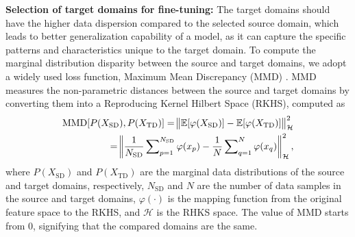\documentclass[letterpaper]{article} %
\begin{document}
\textbf{Selection of target domains for fine-tuning:} The target domains should have the higher data dispersion compared to the selected source domain, which leads to better generalization capability of a model, as it can capture the specific patterns and characteristics unique to the target domain. To compute the marginal distribution disparity between the source and target domains, we adopt a widely used loss function, Maximum Mean Discrepancy (MMD) \cite{gretton2012optimal, khanal2023fda}. MMD measures the non-parametric distances between the source and target domains by converting them into a Reproducing Kernel Hilbert Space (RKHS), computed as
\begin{align}
\begin{split}
        {}\mathrm{MMD}[P(X_{\mathrm{SD}}),P(X_{\mathrm{TD}})] = \norm{\mathbb{E}[\varphi(X_{\mathrm{SD}})]- \mathbb{E}[\varphi(X_{\mathrm{TD}})]}_{\mathcal{H}}^2 \\
        = \norm{\frac{1}{N_{\mathrm{SD}}}\sum\nolimits_{p=1}^{N_{\mathrm{SD}}}\varphi(x_p) - \frac{1}{N}\sum\nolimits_{q=1}^{N}\varphi(x_q)}_{\mathcal{H}}^2,
        \label{mmd}
    \end{split}
\end{align}
where $P(X_{\mathrm{SD}})$ and $P(X_{\mathrm{TD}})$ are the marginal data distributions of the source and target domains, respectively, $N_{\mathrm{SD}}$ and $N$ are the number of data samples in the source and target domains, $\varphi(\cdot)$ is the mapping function from the original feature space to the RKHS, and $\mathcal{H}$ is the  RHKS space. The value of MMD starts from $0$, signifying that the compared domains are the same.
\end{document}
